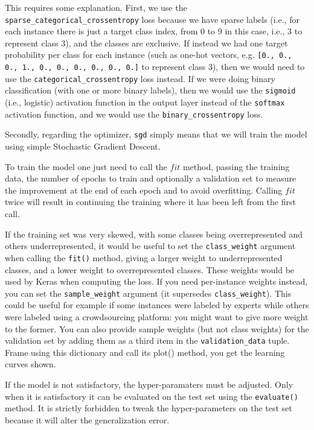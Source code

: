 \documentclass[12pt, letterpaper]{article}
\theoremstyle{definition}
\begin{document}
This requires some explanation. First, we use the \lstinline+sparse_categorical+\lstinline+_crossentropy+ loss because we have sparse labels (i.e., for each instance there is just a target class index, from 0 to 9 in this case, i.e., 3 to represent class 3), and the classes are exclusive. If instead we had one target probability per class for each instance (such as one-hot vectors, e.g. \lstinline+[0., 0., 0., 1., 0., 0., 0., 0., 0., 0.]+ to represent class 3), then we would need to use the \lstinline+categorical_crossentropy+ loss instead. If we were doing binary classification (with one or more binary labels), then we would use the \lstinline+sigmoid+ (i.e., logistic) activation function in the output layer instead of the \lstinline+softmax+ activation function, and we would use the \lstinline+binary_crossentropy+ loss.

Secondly, regarding the optimizer, \lstinline+sgd+ simply means that we will train the model using simple Stochastic Gradient Descent.

To train the model one just need to call the $fit$ method, passing the training data, the number of epochs to train and optionally a validation set to measure the improvement at the end of each epoch and to avoid overfitting. Calling  $fit$ twice will result in continuing the training where it has been left from the first call.

If the training set was very skewed, with some classes being overrepresented and others underrepresented, it would be useful to set the \lstinline+class_weight+ argument when calling the \lstinline+fit()+ method, giving a larger weight to underrepresented classes, and a lower weight to overrepresented classes. These weights would be used by Keras when computing the loss. If you need per-instance weights instead, you can set the \lstinline+sample_weight+ argument (it supersedes \lstinline+class_weight+). This could be useful for example if some instances were labeled by experts while others were labeled using a crowdsourcing platform: you might want to give more weight to the former. You can also provide sample weights (but not class weights) for the validation set by adding them as a third item in the \lstinline+validation_data+ tuple.
Frame using this dictionary and call its plot() method, you get the learning curves shown.

If the model is not satisfactory, the hyper-paramaters must be adjusted. Only when it is satisfactory it can be evaluated on the test set using the \lstinline+evaluate()+ method. It is strictly forbidden to tweak the hyper-parameters on the test set because it will alter the generalization error.
\end{document}
